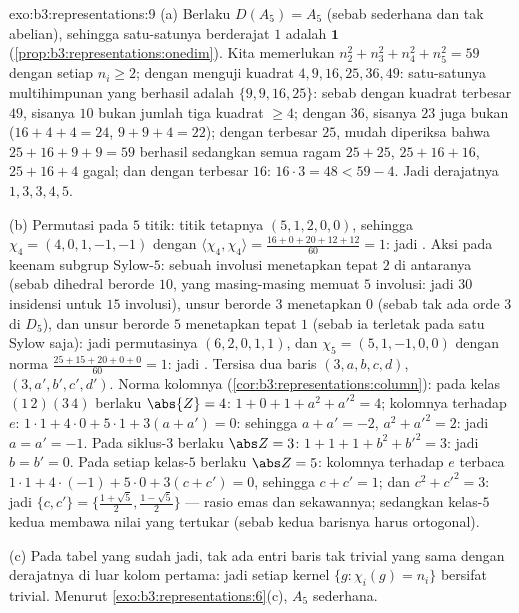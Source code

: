 \begin{solution}{exo:b3:representations:9}
(a) Berlaku $D(A_5) = A_5$ (sebab sederhana dan tak abelian), sehingga satu-satunya
 berderajat $1$ adalah $\mathbf 1$
(\cref{prop:b3:representations:onedim}). Kita memerlukan $n_2^2 + n_3^2
+ n_4^2 + n_5^2 = 59$ dengan setiap $n_i \geq 2$; dengan menguji
kuadrat $4, 9, 16, 25, 36, 49$: satu-satunya multihimpunan yang berhasil adalah
$\{9, 9, 16, 25\}$: sebab dengan kuadrat terbesar $49$, sisanya $10$
bukan jumlah tiga kuadrat $\geq 4$; dengan $36$, sisanya
$23$ juga bukan ($16 + 4 + 4 = 24$, $9 + 9 + 4 = 22$); dengan
terbesar $25$, mudah diperiksa bahwa $25 + 16 + 9 + 9 = 59$ berhasil sedangkan semua ragam $25 +
25$, $25 + 16 + 16$, $25 + 16 + 4$ gagal; dan dengan terbesar
$16$: $16\cdot3 = 48 < 59 - 4$. Jadi derajatnya $1, 3, 3, 4, 5$.

(b) Permutasi pada $5$ titik: titik tetapnya $(5, 1, 2, 0, 0)$,
sehingga $\chi_4 = (4, 0, 1, -1, -1)$ dengan
$\langle\chi_4,\chi_4\rangle = \frac{16 + 0 + 20 + 12 + 12}{60}
= 1$: jadi . Aksi pada keenam subgrup Sylow-$5$: sebuah
involusi menetapkan tepat $2$ di antaranya (sebab  dihedral berorde
$10$, yang masing-masing memuat $5$ involusi: jadi $30$ insidensi
untuk $15$ involusi), unsur berorde $3$ menetapkan $0$ (sebab tak ada orde $3$ di
$D_5$), dan unsur berorde $5$ menetapkan tepat $1$ (sebab ia terletak pada satu
Sylow saja): jadi  permutasinya $(6, 2, 0, 1, 1)$, dan $\chi_5 =
(5, 1, -1, 0, 0)$ dengan norma $\frac{25 + 15 + 20 + 0 + 0}{60} =
1$: jadi . Tersisa dua baris $(3, a, b, c, d)$, $(3, a', b', c',
d')$. Norma kolomnya
(\cref{cor:b3:representations:column}): pada kelas
$(1\,2)(3\,4)$ berlaku $\abs{Z} = 4$: $1 + 0 + 1 + a^2 + a'^2 = 4$;
kolomnya terhadap $e$: $1\cdot1 + 4\cdot 0 + 5\cdot1 + 3(a + a') =
0$: sehingga $a + a' = -2$, $a^2 + a'^2 = 2$: jadi $a = a' = -1$. Pada
siklus-$3$ berlaku $\abs Z = 3$: $1 + 1 + 1 + b^2 + b'^2 = 3$: jadi $b = b'
= 0$. Pada setiap kelas-$5$ berlaku $\abs Z = 5$: kolomnya terhadap $e$
terbaca $1\cdot 1 + 4\cdot(-1) + 5\cdot 0 + 3(c + c') = 0$, sehingga
$c + c' = 1$; dan
$c^2 + c'^2 = 3$: jadi $\{c, c'\} = \bigl\{\frac{1+\sqrt5}2,
\frac{1-\sqrt5}2\bigr\}$ --- rasio emas dan
sekawannya; sedangkan kelas-$5$ kedua membawa nilai yang tertukar (sebab
kedua barisnya harus ortogonal).

(c) Pada tabel yang sudah jadi, tak ada entri baris tak trivial yang sama dengan
derajatnya di luar kolom pertama: jadi setiap kernel $\{g :
\chi_i(g) = n_i\}$ bersifat trivial. Menurut
\cref{exo:b3:representations:6}(c), $A_5$ sederhana.
\end{solution}

